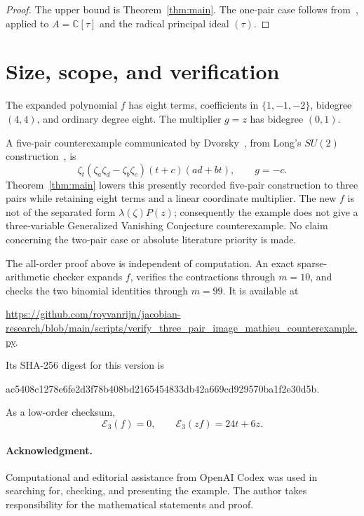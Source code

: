\documentclass[11pt]{article}
\newcommand{\C}{\mathbb C}
\newcommand{\Eop}{\mathcal E}
\begin{document}
\begin{proof}
The upper bound is Theorem~\ref{thm:main}.  The one-pair case follows
from~\cite[Theorem 2.8]{EWZ2011}, applied to
\(A=\C[\tau]\) and the radical principal ideal \((\tau)\).
\end{proof}

\section{Size, scope, and verification}

The expanded polynomial \(f\) has eight terms, coefficients in
\(\{1,-1,-2\}\), bidegree \((4,4)\), and ordinary degree eight.
The multiplier \(g=z\) has bidegree \((0,1)\).

A five-pair counterexample communicated by Dvorsky~\cite{Dvorsky2026},
from Long's \(SU(2)\) construction~\cite{Long2026}, is
\[
 \zeta_t(\zeta_a\zeta_d-\zeta_b\zeta_c)
 (t+c)(ad+bt),\qquad g=-c.
\]
Theorem~\ref{thm:main} lowers this presently recorded five-pair
construction to three pairs while retaining eight terms and a linear
coordinate multiplier.  The new \(f\) is not of the separated form
\(\lambda(\zeta)P(z)\); consequently the example does not give a
three-variable Generalized Vanishing Conjecture counterexample.  No
claim concerning the two-pair case or absolute literature priority is
made.

The all-order proof above is independent of computation.  An exact
sparse-arithmetic checker expands \(f\), verifies the contractions
through \(m=10\), and checks the two binomial identities through
\(m=99\).  It is available at
\begin{center}
\small
\url{https://github.com/royvanrijn/jacobian-research/blob/main/scripts/verify_three_pair_image_mathieu_counterexample.py}.
\end{center}
Its SHA-256 digest for this version is
\begin{center}
\ttfamily\small
ac5408c1278e6fe2d3f78b408bd2165454833db42a669cd929570ba1f2e30d5b.
\end{center}
As a low-order checksum,
\[
 \Eop_3(f)=0,\qquad \Eop_3(zf)=24t+6z.
\]

\paragraph{Acknowledgment.}
Computational and editorial assistance from OpenAI Codex was used in
searching for, checking, and presenting the example.  The author takes
responsibility for the mathematical statements and proof.
\end{document}
